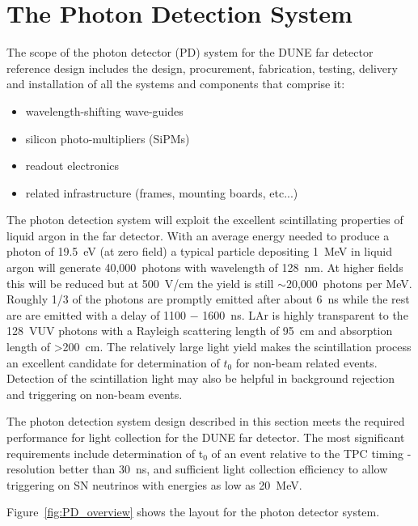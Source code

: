 \section{The Photon Detection System}
\label{sec:detectors-fd-ref-pd}

The scope of the photon detector (PD) system for the DUNE far detector reference design includes the design,
procurement, fabrication, testing, delivery and installation of all
the systems and components that comprise it:  

\begin{itemize}
\item wavelength-shifting wave-guides
\item silicon photo-multipliers (SiPMs)
\item readout electronics
\item related infrastructure (frames, mounting boards, etc...)
\end{itemize}

The photon detection system will exploit the excellent scintillating properties
of liquid argon in the far detector. 
With an average
energy needed to produce a photon of 19.5~eV (at zero field) a typical
particle depositing 1~MeV in liquid argon will generate 40,000~photons
with wavelength of 128~nm. At higher fields this will be reduced but
at 500~V/cm the yield is still $\sim$20,000~photons per
MeV. Roughly 1/3 of the photons are promptly emitted after about 6~ns
while the rest are are emitted with a delay of 1100 $-$ 1600~ns. LAr
is highly transparent to the 128~VUV photons with a Rayleigh
scattering length of 95~cm and absorption length of >200~cm.
 The relatively large light yield makes the scintillation
process an excellent candidate for determination of $t_{0}$ for
non-beam related events. Detection of the scintillation light may also
be helpful in background rejection and triggering on non-beam events.  

The photon detection system design described in this section meets the required performance for light
collection for the DUNE far detector. The most significant
requirements include determination of t$_0$ of an event relative to
the TPC timing - resolution better than 30~ns, and sufficient light
collection efficiency to allow triggering on SN neutrinos with
energies as low as 20~MeV. 

Figure~\ref{fig:PD_overview} shows the layout for the photon
detector system. %

